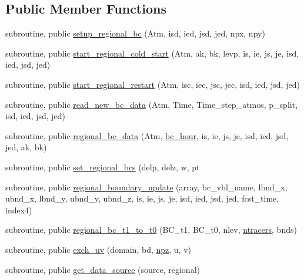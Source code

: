 \subsection*{Public Member Functions}
\begin{DoxyCompactItemize}
\item 
subroutine, public \hyperlink{classfv__regional__mod_a6991aba90c8c7297a002b8ca58f09f99}{setup\-\_\-regional\-\_\-bc} (Atm, isd, ied, jsd, jed, npx, npy)
\item 
subroutine, public \hyperlink{classfv__regional__mod_ad1bf6476615882c211020e8d53c4bf8c}{start\-\_\-regional\-\_\-cold\-\_\-start} (Atm, ak, bk, levp, is, ie, js, je, isd, ied, jsd, jed)
\item 
subroutine, public \hyperlink{classfv__regional__mod_a0d3b818eb47e19e7254ccd506c5a5895}{start\-\_\-regional\-\_\-restart} (Atm, isc, iec, jsc, jec, isd, ied, jsd, jed)
\item 
subroutine, public \hyperlink{classfv__regional__mod_ae3ebee89f81e0493a8c7e17875152d72}{read\-\_\-new\-\_\-bc\-\_\-data} (Atm, Time, Time\-\_\-step\-\_\-atmos, p\-\_\-split, isd, ied, jsd, jed)
\item 
subroutine, public \hyperlink{classfv__regional__mod_a769a4bf5f728fcb86b52d456ac3f08a5}{regional\-\_\-bc\-\_\-data} (Atm, \hyperlink{classfv__regional__mod_a5192ede59906ab120d0ad1a12bcc9ea1}{bc\-\_\-hour}, is, ie, js, je, isd, ied, jsd, jed, ak, bk)
\item 
subroutine, public \hyperlink{classfv__regional__mod_a6dc14a5c1732e07b8961cedbffc1774f}{set\-\_\-regional\-\_\-bcs} (delp, delz, w, pt
\item 
subroutine, public \hyperlink{classfv__regional__mod_ad13eb19c4cba6f952bc2c8360464bba1}{regional\-\_\-boundary\-\_\-update} (array, bc\-\_\-vbl\-\_\-name, lbnd\-\_\-x, ubnd\-\_\-x, lbnd\-\_\-y, ubnd\-\_\-y, ubnd\-\_\-z, is, ie, js, je, isd, ied, jsd, jed, fcst\-\_\-time, index4)
\item 
subroutine, public \hyperlink{classfv__regional__mod_acfdab6124b0e0c814915363e12550d92}{regional\-\_\-bc\-\_\-t1\-\_\-to\-\_\-t0} (B\-C\-\_\-t1, B\-C\-\_\-t0, nlev, \hyperlink{classfv__regional__mod_a59026f4c5f7fbd69bbaf1c53c9418817}{ntracers}, bnds)
\item 
subroutine, public \hyperlink{classfv__regional__mod_a820d191779e94ce32b42d2b0c2ad3102}{exch\-\_\-uv} (domain, bd, \hyperlink{classfv__regional__mod_a66c4d15d316eeb5577275a92f68c14c1}{npz}, u, v)
\item 
subroutine, public \hyperlink{classfv__regional__mod_af347265c2839a84abc162e9cb89a34d1}{get\-\_\-data\-\_\-source} (source, regional)
\end{DoxyCompactItemize}
